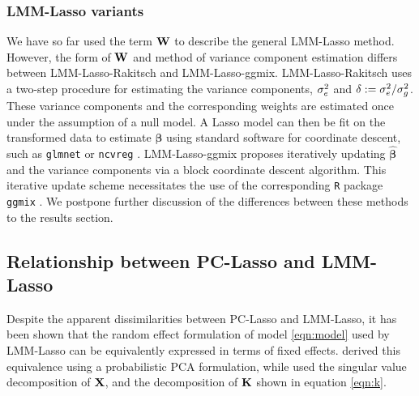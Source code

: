 \subsubsection{LMM-Lasso variants}
\label{sec:rak-ggmix}

We have so far used the term $\textbf{W}$ to describe the general LMM-Lasso method. However, the form of $\textbf{W}$ and method of variance component estimation differs between LMM-Lasso-Rakitsch and LMM-Lasso-ggmix. LMM-Lasso-Rakitsch \cite{Rakitsch2012} uses a two-step procedure for estimating the variance components, $\sigma^2_e$ and $\delta := \sigma^2_e / \sigma^2_g$. These variance components and the corresponding weights are estimated once under the assumption of a null model. A Lasso model can then be fit on the transformed data to estimate $\boldsymbol{\beta}$ using standard software for coordinate descent, such as \texttt{glmnet} \cite{glmnet} or \texttt{ncvreg} \cite{ncvreg}. LMM-Lasso-ggmix \cite{bhatnagar2019simultaneous} proposes iteratively updating $\widehat{\boldsymbol{\beta}}$ and the variance components via a block coordinate descent algorithm. This iterative update scheme necessitates the use of the corresponding \texttt{R} package \texttt{ggmix} \cite{ggmix, bhatnagar2019simultaneous}. We postpone further discussion of the differences between these methods to the results section.



\subsection{Relationship between PC-Lasso and LMM-Lasso}


Despite the apparent dissimilarities between PC-Lasso and LMM-Lasso, it has been shown that the random effect formulation of model \eqref{eqn:model} used by LMM-Lasso can be equivalently expressed in terms of fixed effects. \cite{zhang2015principal} derived this equivalence using a probabilistic PCA formulation, while \cite{hoffman2013correcting} used the singular value decomposition of $\textbf{X}$, and the decomposition of $\textbf{K}$ shown in equation \eqref{eqn:k}. 

